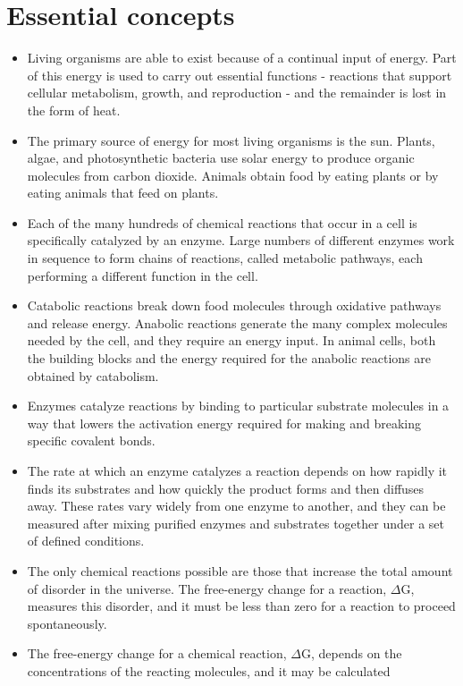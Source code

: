 \section{Essential concepts}

\begin{itemize}
\item Living organisms are able to exist because of a continual input
of energy. Part of this energy is used to carry out essential functions
- reactions that support cellular metabolism, growth, and
reproduction - and the remainder is lost in the form of heat.
\item The primary source of energy for most living organisms is the sun.
Plants, algae, and photosynthetic bacteria use solar energy to produce
organic molecules from carbon dioxide. Animals obtain food by
eating plants or by eating animals that feed on plants.
\item Each of the many hundreds of chemical reactions that occur in a cell
is specifically catalyzed by an enzyme. Large numbers of different
enzymes work in sequence to form chains of reactions, called metabolic
pathways, each performing a different function in the cell.
\item Catabolic reactions break down food molecules through oxidative
pathways and release energy. Anabolic reactions generate the
many complex molecules needed by the cell, and they require an
energy input. In animal cells, both the building blocks and the energy
required for the anabolic reactions are obtained by catabolism.
\item Enzymes catalyze reactions by binding to particular substrate molecules
in a way that lowers the activation energy required for making
and breaking specific covalent bonds.
\item The rate at which an enzyme catalyzes a reaction depends on how
rapidly it finds its substrates and how quickly the product forms and
then diffuses away. These rates vary widely from one enzyme to
another, and they can be measured after mixing purified enzymes
and substrates together under a set of defined conditions.
\item The only chemical reactions possible are those that increase the
total amount of disorder in the universe. The free-energy change for
a reaction, $\Delta$G, measures this disorder, and it must be less than zero
for a reaction to proceed spontaneously.
\item The free-energy change for a chemical reaction, $\Delta$G, depends on the
concentrations of the reacting molecules, and it may be calculated

\end{itemize}
